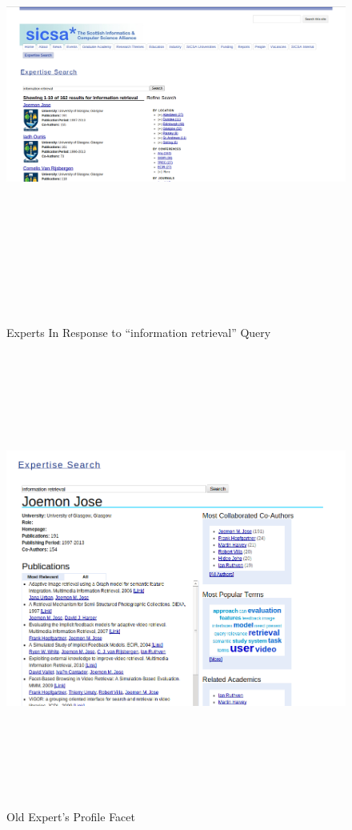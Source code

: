 \begin{figure}[H]
\centering
\includegraphics[width=13cm,height=15cm,keepaspectratio]{./figures/oldsearch.png}
\caption{Experts In Response to ``information retrieval'' Query} \label{fig:resultspage} 
\end{figure}
\begin{figure}[H]
\centering
\includegraphics[width=13cm,height=15cm,keepaspectratio]{./figures/oldProfilePage.png}
\caption{Old Expert's Profile Facet} \label{fig:profilepage} 
\end{figure}

